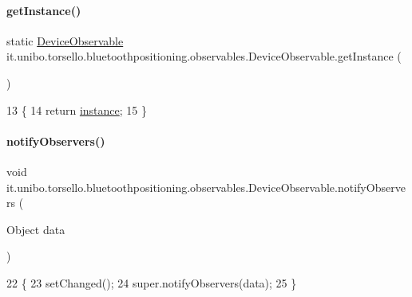 \paragraph{\texorpdfstring{get\+Instance()}{getInstance()}}
{\footnotesize\ttfamily static \hyperlink{classit_1_1unibo_1_1torsello_1_1bluetoothpositioning_1_1observables_1_1DeviceObservable}{Device\+Observable} it.\+unibo.\+torsello.\+bluetoothpositioning.\+observables.\+Device\+Observable.\+get\+Instance (\begin{DoxyParamCaption}{ }\end{DoxyParamCaption})\hspace{0.3cm}{\ttfamily [static]}}


\begin{DoxyCode}
13                                                  \{
14         \textcolor{keywordflow}{return} \hyperlink{classit_1_1unibo_1_1torsello_1_1bluetoothpositioning_1_1observables_1_1DeviceObservable_a43120f0ae1d6ae6c543219ec42df15e2_a43120f0ae1d6ae6c543219ec42df15e2}{instance};
15     \}
\end{DoxyCode}
\hypertarget{classit_1_1unibo_1_1torsello_1_1bluetoothpositioning_1_1observables_1_1DeviceObservable_aaf183e537e44cbd114c8eb76432da191_aaf183e537e44cbd114c8eb76432da191}{}\label{classit_1_1unibo_1_1torsello_1_1bluetoothpositioning_1_1observables_1_1DeviceObservable_aaf183e537e44cbd114c8eb76432da191_aaf183e537e44cbd114c8eb76432da191} 
\paragraph{\texorpdfstring{notify\+Observers()}{notifyObservers()}}
{\footnotesize\ttfamily void it.\+unibo.\+torsello.\+bluetoothpositioning.\+observables.\+Device\+Observable.\+notify\+Observers (\begin{DoxyParamCaption}\item[{Object}]{data }\end{DoxyParamCaption})}


\begin{DoxyCode}
22                                              \{
23         setChanged();
24         super.notifyObservers(data);
25     \}
\end{DoxyCode}


